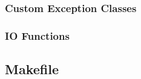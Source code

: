\documentclass[10pt,letterpaper]{article}
\newcounter{x}\setcounter{x}{1}
\begin{document}
\noindent\hrulefill

\subsubsection*{Custom Exception Classes}







\noindent\hrulefill

\subsubsection*{IO Functions}



\noindent\hrulefill



\noindent\hrulefill

\subsection*{Makefile}


\end{document}
